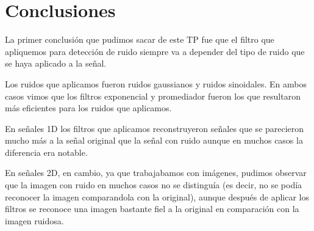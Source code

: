 \section{Conclusiones}

La primer conclusi\'on que pudimos sacar de este TP fue que el filtro que apliquemos para detecci\'on de ruido
siempre va a depender del tipo de ruido que se haya aplicado a la se\~nal.

Los ruidos que aplicamos fueron ruidos gaussianos y ruidos sinoidales. En ambos casos vimos que los filtros
exponencial y promediador fueron los que resultaron m\'as eficientes para los ruidos que aplicamos.

En se\~nales 1D los filtros que aplicamos reconstruyeron se\~nales que se parecieron mucho m\'as a la se\~nal
original que la se\~nal con ruido aunque en muchos casos la diferencia era notable.

En se\~nales 2D, en cambio, ya que trabajabamos con im\'agenes, pudimos observar que la imagen con ruido en muchos
casos no se distingu\'ia (es decir, no se pod\'ia reconocer la imagen comparandola con la original), aunque despu\'es
de aplicar los filtros se reconoce una imagen bastante fiel a la original en comparaci\'on con la imagen ruidosa.
